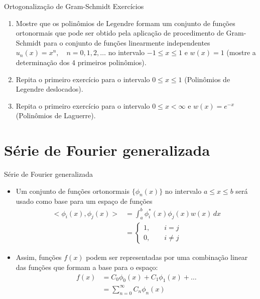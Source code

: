      \begin{slide}[toc=]{Ortogonalização de Gram-Schmidt}
	     Exercícios
	     \begin{enumerate}
		     \item Mostre que os polinômios de Legendre formam um conjunto de funções ortonormais que pode ser obtido pela aplicação de procedimento de Gram-Schmidt para o conjunto de funções linearmente independentes $u_n(x) = x^n,\quad n=0,1,2,\dots$ no intervalo $-1\leq x \leq 1$ e $w(x) = 1$ (mostre a determinação dos 4 primeiros polinômios).
		     \item Repita o primeiro exercício para o intervalo $0\leq x \leq 1$ (Polinômios de Legendre deslocados).
		     \item Repita o primeiro exercício para o intervalo $0\leq x < \infty$ e $w(x) = e^{-x}$ (Polinômios de Laguerre).
	     \end{enumerate}
     \end{slide}
     
     \section[slide=True]{Série de Fourier generalizada}
     \begin{slide}[toc=]{Série de Fourier generalizada}
	     \begin{itemize}
		     \item Um conjunto de funções ortonormais $\{\phi_n(x)\}$ no intervalo $a\leq x \leq b$ será usado como base para um espaço de funções
			     \begin{align*}
				     <\phi_i(x),\phi_j(x)> &= \int_a^b\phi_i^\ast(x) \phi_j(x) w(x)\,dx\\
				                           &=\begin{cases} 1,\qquad i=j\\ 0,\qquad i\neq j\end{cases}
			     \end{align*}\pause
		     \item Assim, funções $f(x)$ podem ser representadas por uma combinação linear das funções que formam a base para o espaço:
			     \begin{align*}
				     f(x) &= C_0\phi_0(x) + C_1\phi_1(x) +\dots\\
				          &= \sum_{n=0}^\infty C_n\phi_n(x)
			     \end{align*}
	     \end{itemize}
     \end{slide}
     
